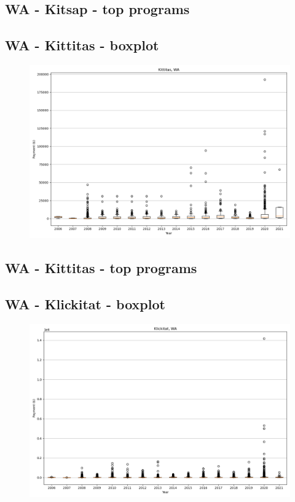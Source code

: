 \subsection*{WA - Kitsap - top programs}

\newpage
\subsection*{WA - Kittitas - boxplot}
\begin{figure}[h]
\centering
\includegraphics[width=7in]{../output/boxplots/counties/Kittitas-WA_boxplot.png}
\end{figure}


\subsection*{WA - Kittitas - top programs}

\newpage
\subsection*{WA - Klickitat - boxplot}
\begin{figure}[h]
\centering
\includegraphics[width=7in]{../output/boxplots/counties/Klickitat-WA_boxplot.png}
\end{figure}


